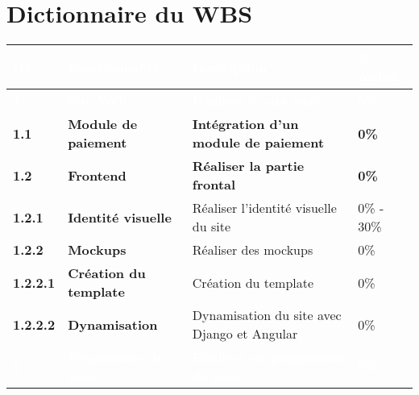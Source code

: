 \section{Dictionnaire du WBS}
\footnotesize
\begin{supertabular}{|p{2.8cm} p{6cm}|p{5cm}|R{2cm}|}
  \hline
  \textcolor{white}{\textbf{ID}} & \textcolor{white}{\textbf{Fonctionnalité}} & \textcolor{white}{\textbf{Description}} & \textcolor{white}{\textbf{\% réalisé}} \\
  \hline
  \hline


  \textcolor{white}{\textbf{1}} & \textcolor{white}{\textbf{Site Web}} & \textcolor{white}{\textbf{Réaliser le site web}} & \textcolor{white}{\textbf{0\%}} \\
  \hline

  \textbf{1.1}  & \textbf{Module de paiement} & \textbf{Intégration d'un module de paiement} & \textbf{0\%} \\
  \hline

  \textbf{1.2}  & \textbf{Frontend} & \textbf{Réaliser la partie frontal} & \textbf{0\%} \\
  \hline

  \hspace{6pt}
  \textbf{1.2.1}  & \textbf{Identité visuelle} & Réaliser l'identité visuelle du site & 0\% - 30\% \\
  \hline

  \hspace{6pt}
  \textbf{1.2.2}  & \textbf{Mockups} & Réaliser des mockups & 0\% \\
  \hline

  \hspace{12pt}
  \textbf{1.2.2.1}  & \textbf{Création du template} & Création du template & 0\% \\
  \hline

  \hspace{12pt}
  \textbf{1.2.2.2}  & \textbf{Dynamisation} & Dynamisation du site avec Django et Angular & 0\% \\
  \hline




  \textcolor{white}{\textbf{2}}  & \textcolor{white}{\textbf{Programme de scan}} & \textcolor{white}{\textbf{Réaliser un programme de scan}} & \textcolor{white}{\textbf{0\%}} \\
  \hline


\end{supertabular}
